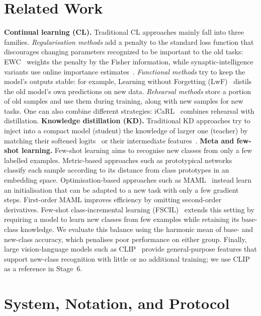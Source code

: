 \documentclass[conference]{IEEEtran}
\begin{document}
\section{Related Work}
\textbf{Continual learning (CL).} Traditional CL approaches mainly fall into three families.
\emph{Regularisation methods} add a penalty to the standard loss function that discourages changing parameters recognized to be
important to the old tasks: EWC~\cite{kirkpatrick2017ewc} weights the penalty by the Fisher information, while synaptic-intelligence variants use online importance estimates~\cite{zenke2017si}. 
\emph{Functional methods} try to keep the model's outputs stable: for example, Learning without Forgetting (LwF)~\cite{li2017lwf} distils the old model's own predictions on new data. \emph{Rehearsal methods} store a portion of old samples and use them during training, along with new samples for new tasks. One can also combine different strategies: iCaRL~\cite{rebuffi2017icarl} combines rehearsal with distillation. 
\textbf{Knowledge distillation (KD).} Traditional KD approaches try to inject into a compact model (student) the knowledge of larger one (teacher) by matching their softened logits~\cite{hinton2015kd} or their intermediate features~\cite{romero2015fitnets}. 
\textbf{Meta and few-shot learning.} Few-shot learning aims to recognise new classes from only a few labelled
examples. Metric-based approaches such as prototypical networks~\cite{snell2017proto} classify each sample according to
its distance from class prototypes in an embedding space. Optimisation-based approaches such as
MAML~\cite{finn2017maml} instead learn an initialisation that can be adapted to a new task with only a few gradient
steps. First-order MAML improves efficiency by omitting second-order derivatives. Few-shot class-incremental learning
(FSCIL)~\cite{tao2020fscil} extends this setting by requiring a model to learn new classes from few examples while
retaining its base-class knowledge. We evaluate this balance using the harmonic mean of base- and new-class accuracy,
which penalises poor performance on either group. Finally, large vision-language models such as
CLIP~\cite{radford2021clip} provide general-purpose features that support new-class recognition with little or no
additional training; we use CLIP as a reference in Stage~6.

\section{System, Notation, and Protocol}
\label{sec:setup}
\end{document}
